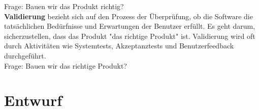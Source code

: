 \documentclass{article}
\begin{document}
\begin{enumerate}[label=\alph*)]
Frage: Bauen wir das Produkt richtig?\\

\textbf{Validierung} bezieht sich auf den Prozess der Überprüfung, ob die Software die tatsächlichen Bedürfnisse und Erwartungen der Benutzer erfüllt. Es geht darum, sicherzustellen, dass das Produkt "das richtige Produkt" ist. Validierung wird oft durch Aktivitäten wie Systemtests, Akzeptanztests und Benutzerfeedback durchgeführt.\\

Frage: Bauen wir das richtige Produkt?\\

\end{enumerate}
\newpage
{}
\section*{Entwurf}
\end{document}
